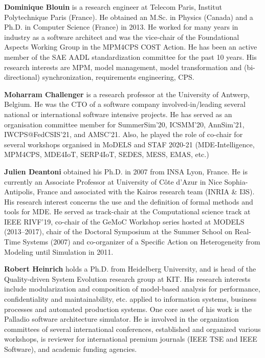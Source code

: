 \noindent
\textbf{Dominique Blouin} is a research engineer at Telecom Paris, Institut Polytechnique Paris 
(France). He obtained an M.Sc. in Physics (Canada) and a Ph.D. in Computer Science (France) in 2013. He worked for many years in industry as a software architect and was the vice-chair of the Foundational Aspects Working Group in the MPM4CPS COST Action. He has been an active member of the SAE AADL standardization committee for the past 10 years. His research interests are MPM, model management, model transformation and (bi-directional) synchronization, requirements engineering, CPS.

\noindent
\textbf{Moharram Challenger} is a research professor at the University of Antwerp, Belgium. He was the CTO of a software company involved-in/leading several national or international software intensive projects. He has served as an organisation committee member for SummerSim'20, ICSMM'20, AnnSim'21, IWCPS@FedCSIS'21, and AMSC'21. Also, he played the role of co-chair for several workshops organised in MoDELS and STAF 2020-21 (MDE-Intelligence, MPM4CPS, MDE4IoT, SERP4IoT, SEDES, MESS, EMAS, etc.)

\noindent
\textbf{Julien Deantoni} obtained his Ph.D. in 2007 from INSA Lyon, France. He is currently an Associate Professor at University of Côte d'Azur in Nice Sophia-Antipolis, France and associated with the Kairos research team (INRIA \& I3S).
His research interest concerns the use and the definition of formal methods and tools for MDE.
He served as track-chair at the Computational science track at IEEE RIVF'19, co-chair of the GeMoC Workshop series hosted at MODELS (2013--2017), chair of the Doctoral Symposium at the Summer School on Real-Time Systems (2007) and co-organizer of a Specific Action on Heterogeneity from Modeling until Simulation in 2011.

\noindent
\textbf{Robert Heinrich} holds a Ph.D. from Heidelberg University, and is head of the Quality-driven System Evolution research group at KIT. His research interests include modularization
and composition of model-based analysis for performance, confidentiality and maintainability, etc. applied to information systems, business processes and automated production systems. One core asset of his work is the Palladio software architecture simulator. He is involved in the organization committees of several international conferences, established and organized various workshops, is reviewer for international premium journals (IEEE TSE and IEEE Software), and academic funding agencies.


